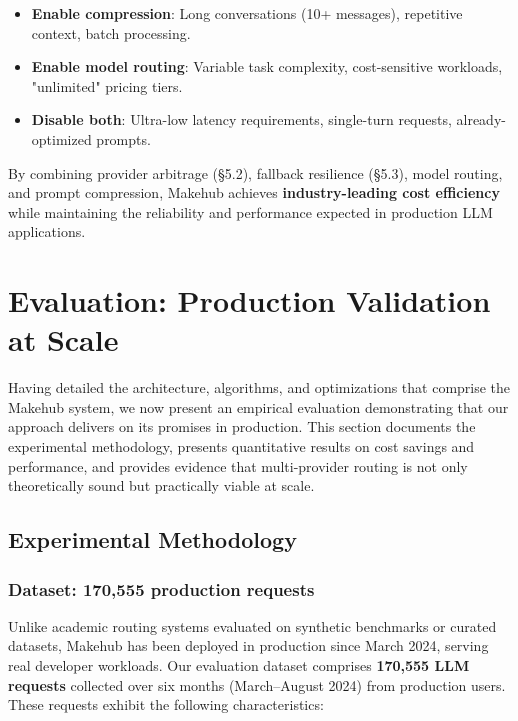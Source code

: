 \documentclass[english]{article}
\begin{document}
\begin{itemize}
    \item \textbf{Enable compression}: Long conversations (10+ messages), repetitive context, batch processing.
    \item \textbf{Enable model routing}: Variable task complexity, cost-sensitive workloads, "unlimited" pricing tiers.
    \item \textbf{Disable both}: Ultra-low latency requirements, single-turn requests, already-optimized prompts.
\end{itemize}

By combining provider arbitrage (§5.2), fallback resilience (§5.3), model routing, and prompt compression, Makehub achieves \textbf{industry-leading cost efficiency} while maintaining the reliability and performance expected in production LLM applications.


\newpage
\section{Evaluation: Production Validation at Scale}

Having detailed the architecture, algorithms, and optimizations that comprise the Makehub system, we now present an empirical evaluation demonstrating that our approach delivers on its promises in production. This section documents the experimental methodology, presents quantitative results on cost savings and performance, and provides evidence that multi-provider routing is not only theoretically sound but practically viable at scale.

\subsection{Experimental Methodology}

\subsubsection{Dataset: 170,555 production requests}

Unlike academic routing systems evaluated on synthetic benchmarks or curated datasets, Makehub has been deployed in production since March 2024, serving real developer workloads. Our evaluation dataset comprises \textbf{170,555 LLM requests} collected over six months (March--August 2024) from production users. These requests exhibit the following characteristics:

\medskip
\end{document}
